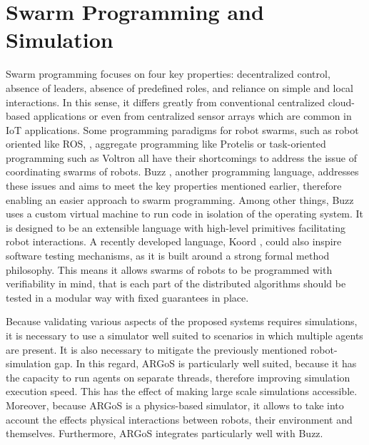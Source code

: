 \section{Swarm Programming and Simulation}
Swarm programming focuses on four key properties: decentralized control, absence of leaders, absence of predefined roles, and reliance on simple and local interactions. In this sense, it differs greatly from conventional centralized cloud-based applications or even from centralized sensor arrays which are common in \ac{IoT} applications. Some programming paradigms for robot swarms, such as robot oriented like ROS, \cite{quigley2009ros}, aggregate programming like Protelis \cite{pianini2015protelis} or task-oriented programming such as Voltron \cite{mottola2014team} all have their shortcomings to address the issue of coordinating swarms of robots. Buzz \cite{pinciroliBuzz2016}, another programming language, addresses these issues and aims to meet the key properties mentioned earlier, therefore enabling an easier approach to swarm programming. Among other things, Buzz uses a custom virtual machine to run code in isolation of the operating system. It is designed to be an extensible language with high-level primitives facilitating robot interactions. A recently developed language, Koord \cite{ghosh2020koord}, could also inspire software testing mechanisms, as it is built around a strong formal method philosophy. This means it allows swarms of robots to be programmed with verifiability in mind, that is each part of the distributed algorithms should be tested in a modular way with fixed guarantees in place.

Because validating various aspects of the proposed systems requires simulations, it is necessary to use a simulator well suited to scenarios in which multiple agents are present. It is also necessary to mitigate the previously mentioned robot-simulation gap. In this regard, ARGoS  \cite{Pinciroli:SI2012} is particularly well suited, because it has the capacity to run agents on separate threads, therefore improving simulation execution speed. This has the effect of making large scale simulations accessible. Moreover, because ARGoS is a physics-based simulator, it allows to take into account the effects physical interactions between robots, their environment and themselves. Furthermore, ARGoS integrates particularly well with Buzz.

